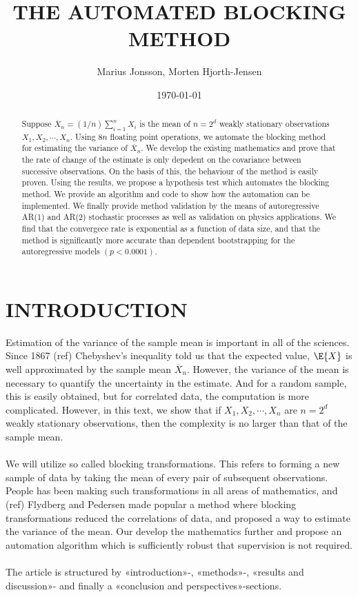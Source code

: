 \documentclass[11pt,english,a4paper]{article}
\author{\normalsize Marius Jonsson, Morten Hjorth-Jensen}
\title{\bf \uppercase{The automated blocking method}}
\date{\normalsize \today}
\begin{document}
\maketitle
\begin{abstract} \normalsize
Suppose $\overline{ X}_n = (1/n) \sum_{i=1}^{n} X_i$ is the mean of $n = 2^d$ weakly stationary observations $X_1,X_2,\cdots,X_n$. Using $8n$ floating point operations, we automate the blocking method for estimating the variance of $\overline{ X}_n$. We develop the existing mathematics and prove that the rate of change of the estimate is only depedent on the covariance between successive observations. On the basis of this, the behaviour of the method is easily proven. Using the results, we propose a hypothesis test which automates the blocking method. We provide an algorithm and code to show how the automation can be implemented. We finally provide method validation by the means of autoregressive AR(1) and AR(2) stochastic processes as well as validation on physics applications. We find that the convergece rate is exponential as a function of data size, and that the method is significantly more accurate than dependent bootstrapping for the autoregressive models $(p<0.0001)$.
\end{abstract}
\section*{\uppercase{Introduction}}
Estimation of the variance of the sample mean is important in all of the sciences. Since 1867 (ref) Chebyshev's inequality told us that the expected value, $\E{X}$ is well approximated by the sample mean $\overline{X}_n$. However, the variance of the mean is necessary to quantify the uncertainty in the estimate. And for a random sample, this is easily obtained, but for correlated data, the computation is more complicated. However, in this text, we show that if $X_1,X_2,\cdots,X_n$ are $n = 2^d$ weakly stationary observations, then the complexity is no larger than that of the sample mean.\\
\\
We will utilize so called blocking transformations. This refers to forming a new sample of data by taking the mean of every pair of subsequent observations. People has been making such transformations in all areas of mathematics, and (ref) Flydberg and Pedersen made popular a method where blocking transformations reduced the correlations of data, and proposed a way to estimate the variance of the mean. Our develop the mathematics further and propose an automation algorithm which is sufficiently robust that supervision is not required.\\
\\
The article is structured by «introduction»-, «methods»-, «results and discussion»- and finally a «conclusion and perspectives»-sections.
\end{document}
